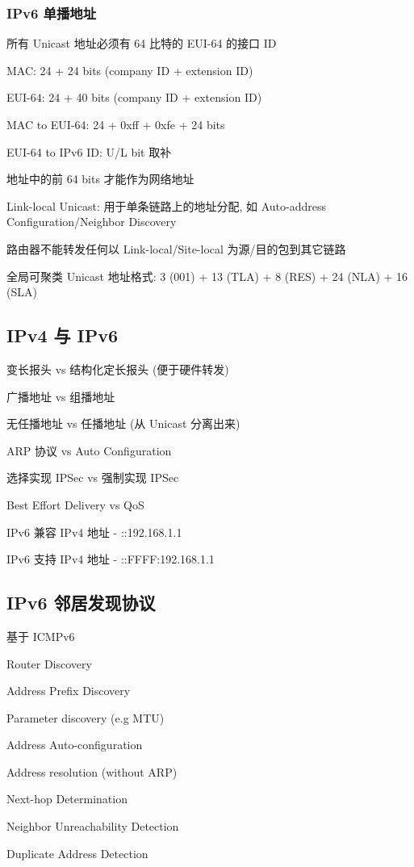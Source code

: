 \documentclass[UTF8,cs4size]{ctexart}
\begin{document}
\subsubsection{IPv6 单播地址}
\begin{compactitem}
  \item 所有 Unicast 地址必须有 64 比特的 EUI-64 的接口 ID 
  \item MAC: 24 + 24 bits (company ID + extension ID)
  \item EUI-64: 24 + 40 bits (company ID + extension ID)
  \item MAC to EUI-64: 24 + 0xff + 0xfe + 24 bits
  \item EUI-64 to IPv6 ID: U/L bit 取补
  \item 地址中的前 64 bits 才能作为网络地址
  \item Link-local Unicast: 用于单条链路上的地址分配, 如 Auto-address Configuration/Neighbor Discovery
  \item 路由器不能转发任何以 Link-local/Site-local 为源/目的包到其它链路
  \item 全局可聚类 Unicast 地址格式: 3 (001) + 13 (TLA) + 8 (RES) + 24 (NLA) + 16 (SLA)
\end{compactitem}
\subsection{IPv4 与 IPv6}
\begin{compactitem}
  \item 变长报头 vs 结构化定长报头 (便于硬件转发)
  \item 广播地址 vs 组播地址
  \item 无任播地址 vs 任播地址 (从 Unicast 分离出来)
  \item ARP 协议 vs Auto Configuration
  \item 选择实现 IPSec vs 强制实现 IPSec
  \item Best Effort Delivery vs QoS
  \item IPv6 兼容 IPv4 地址 - ::192.168.1.1
  \item IPv6 支持 IPv4 地址 - ::FFFF:192.168.1.1
\end{compactitem}
\subsection{IPv6 邻居发现协议}
\begin{compactitem}
  \item 基于 ICMPv6
  \item Router Discovery
  \item Address Prefix Discovery
  \item Parameter discovery (e.g MTU)
  \item Address Auto-configuration
  \item Address resolution (without ARP)
  \item Next-hop Determination
  \item Neighbor Unreachability Detection
  \item Duplicate Address Detection
\end{compactitem}
\end{document}
